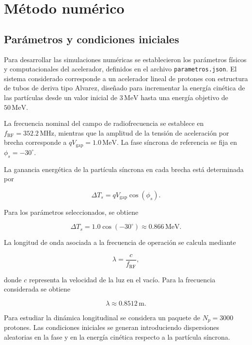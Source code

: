\chapter{Método numérico}

\section{Parámetros y condiciones iniciales}

Para desarrollar las simulaciones numéricas se establecieron los parámetros físicos y computacionales del acelerador, definidos en el archivo \texttt{parametros.json}. El sistema considerado corresponde a un acelerador lineal de protones con estructura de tubos de deriva tipo Alvarez, diseñado para incrementar la energía cinética de las partículas desde un valor inicial de $3\,\mathrm{MeV}$ hasta una energía objetivo de $50\,\mathrm{MeV}$.

La frecuencia nominal del campo de radiofrecuencia se establece en
$f_{\mathrm{RF}}=352.2\,\mathrm{MHz}$, mientras que la amplitud de la tensión de aceleración por brecha corresponde a
$qV_{\mathrm{gap}}=1.0\,\mathrm{MeV}$.
La fase síncrona de referencia se fija en
$\phi_s=-30^\circ$.

La ganancia energética de la partícula síncrona en cada brecha está determinada por

\begin{equation}
    \Delta T_s=qV_{\mathrm{gap}}\cos(\phi_s).
\end{equation}

Para los parámetros seleccionados, se obtiene

\begin{equation}
    \Delta T_s
    =1.0\cos(-30^\circ)
    \approx 0.866\,\mathrm{MeV}.
\end{equation}

La longitud de onda asociada a la frecuencia de operación se calcula mediante

\begin{equation}
    \lambda=\frac{c}{f_{\mathrm{RF}}},
\end{equation}

donde $c$ representa la velocidad de la luz en el vacío. Para la frecuencia considerada se obtiene

\begin{equation}
    \lambda\approx0.8512\,\mathrm{m}.
\end{equation}

Para estudiar la dinámica longitudinal se considera un paquete de
$N_p=3000$ protones. Las condiciones iniciales se generan introduciendo dispersiones aleatorias en la fase y en la energía cinética respecto a la partícula síncrona.

